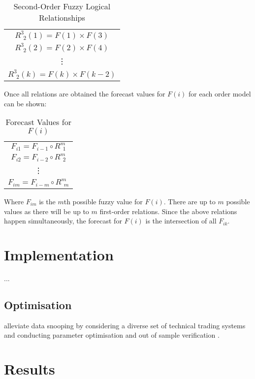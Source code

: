 \documentclass{article}
\theoremstyle{definition}
\begin{document}
\begin{table}[H]
	\center
	\begin{tabular}{ c }
  	$R^{3}_{\ \ 2}(1) = F(1) \times F(3)$ \\
  	$R^{3}_{\ \ 2}(2) = F(2) \times F(4)$ \\
  	\vdots \\
  	$R^{3}_{\ \ 2}(k) = F(k) \times F(k-2)$ \\
	\end{tabular}
	\caption{Second-Order Fuzzy Logical Relationships}
\end{table}

Once all relations are obtained the forecast values for $F(i)$ for each order model can be shown:

\begin{table}[H]
	\center
	\begin{tabular}{ c }
  	$F_{i1} = F_{i-1} \circ R^{m}_{\ \ 1}$ \\
  	$F_{i2} = F_{i-2} \circ R^{m}_{\ \ 2}$ \\
  	\vdots \\
  	$F_{im} = F_{i-m} \circ R^{m}_{\ \ m}$ \\
	\end{tabular}
	\caption{Forecast Values for $F(i)$}
\end{table}

Where $F_{im}$ is the $m$th possible fuzzy value for $F(i)$. There are up to $m$ possible values as there will be up to $m$ first-order relations. Since the above relations happen simultaneously, the forecast for $F(i)$ is the intersection of all $F_{ik}$.

\section{Implementation}

...

\subsection{Optimisation}

alleviate data snooping by considering a diverse set of technical trading systems and conducting parameter optimisation and out of sample verification \citep{taprofitability}.

\section{Results}
\end{document}
